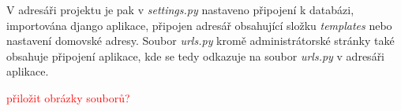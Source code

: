 V adresáři projektu je pak v \emph{settings.py} nastaveno připojení k
 databázi, importována django aplikace, připojen adresář obsahující
 složku \emph{templates} nebo nastavení domovské adresy. Soubor
 \emph{urls.py} kromě administrátorské stránky také obsahuje připojení
 aplikace, kde se tedy odkazuje na soubor \emph{urls.py} v adresáři
 aplikace.

\textcolor{red}{přiložit obrázky souborů?}


